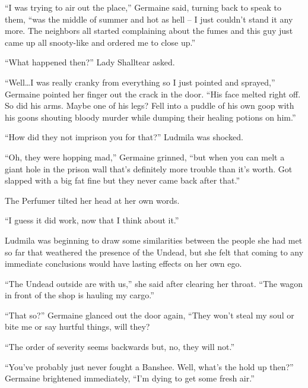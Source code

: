 “I was trying to air out the place,” Germaine said, turning back to speak to them, “was the middle of summer and hot as hell – I just couldn’t stand it any more. The neighbors all started complaining about the fumes and this guy just came up all snooty-like and ordered me to close up.”

 

“What happened then?” Lady Shalltear asked.

 

“Well…I was really cranky from everything so I just pointed and sprayed,” Germaine pointed her finger out the crack in the door. “His face melted right off. So did his arms. Maybe one of his legs? Fell into a puddle of his own goop with his goons shouting bloody murder while dumping their healing potions on him.”

 

“How did they not imprison you for that?” Ludmila was shocked.

 

“Oh, they were hopping mad,” Germaine grinned, “but when you can melt a giant hole in the prison wall that’s definitely more trouble than it’s worth. Got slapped with a big fat fine but they never came back after that.”

 

The Perfumer tilted her head at her own words.

 

“I guess it did work, now that I think about it.”

 

Ludmila was beginning to draw some similarities between the people she had met so far that weathered the presence of the Undead, but she felt that coming to any immediate conclusions would have lasting effects on her own ego.

 

“The Undead outside are with us,” she said after clearing her throat. “The wagon in front of the shop is hauling my cargo.”

 

“That so?” Germaine glanced out the door again, “They won’t steal my soul or bite me or say hurtful things, will they?

 

“The order of severity seems backwards but, no, they will not.”

 

“You’ve probably just never fought a Banshee. Well, what’s the hold up then?” Germaine brightened immediately, “I’m dying to get some fresh air.”

